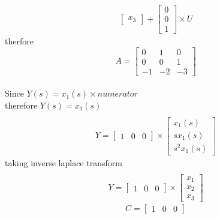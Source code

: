 \begin{enumerate}[label=\thesection.\arabic*.,ref=\thesection.\theenumi]
\begin{gather}
\begin{bmatrix}
x_{3}
\end{bmatrix}
+
\begin{bmatrix}
0\\
0\\
1
\end{bmatrix} \times U
\end{gather}
therfore
\begin{equation}
A=\begin{bmatrix}
0&1&0\\
0&0&1\\
-1&-2&-3
\end{bmatrix}
\end{equation}
\\
Since $ Y(s)=x_{1}(s)\times numerator$
\\therefore $ Y(s)=x_{1}(s) $
\begin{gather}
\\Y=
\begin{bmatrix}
1&0&0
\end{bmatrix}\times \begin{bmatrix}
x_{1}(s)\\
sx_{1}(s)\\
s^2x_{1}(s)
\end{bmatrix} 
\end{gather}
taking inverse laplace transform
\begin{gather}
\\Y=
\begin{bmatrix}
1&0&0
\end{bmatrix}\times \begin{bmatrix}
x_{1}\\
x_{2}\\
x_{3}
\end{bmatrix} 
\end{gather}
\begin{equation}
C=\begin{bmatrix}
1&0&0
\end{bmatrix}
\end{equation}
%

%
\end{enumerate}

